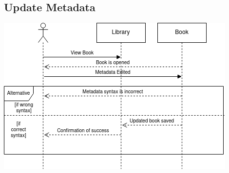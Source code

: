 \documentclass[answers]{exam}
\begin{document}
\subsection{Update Metadata}
\begin{center}
    \includegraphics[scale=0.75]{images/seq9.png}
\end{center}
\end{document}

